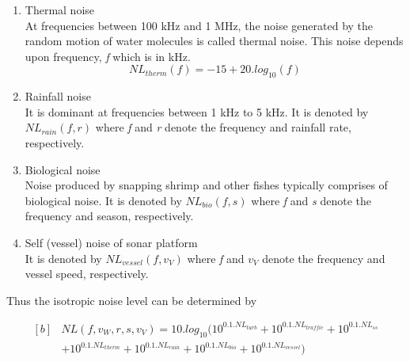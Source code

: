 \begin{enumerate}
  \item Thermal noise \\
\noindent At frequencies between 100 kHz and 1 MHz, the noise generated by the random motion of water molecules is called thermal noise. This noise depends upon frequency, \textit{f} which is in kHz.
\begin{equation}
 NL_{therm}(\textit{f}) = -15 + 20 . log_{10}(\textit{f}) 
\end{equation}

  \item Rainfall noise \\
\noindent It is dominant at frequencies between 1 kHz to 5 kHz. It is denoted by $NL_{rain}(\textit{f}, \textit{r})$ where \textit{f} and \textit{r} denote the frequency and rainfall rate, respectively.

\item Biological noise \\
\noindent Noise produced by snapping shrimp and other fishes typically comprises of biological noise. It is denoted by $NL_{bio}(\textit{f}, \textit{s})$ where \textit{f} and \textit{s} denote the frequency and season, respectively.

\item Self (vessel) noise of sonar platform \\
\noindent It is denoted by $NL_{vessel}(\textit{f}, {v_V})$ where \textit{f} and ${v_V}$ denote the frequency and vessel speed, respectively.
 \end{enumerate}

\noindent  Thus the isotropic noise level can be determined by

\begin{equation}
\begin{aligned}[b]
 & NL (\textit{f}, {v_W},\textit{r},\textit{s}, {v_V}) = 10 . log_{10}(10^{0.1 . NL_{turb}} + 10^{0.1 . NL_{traffic}} + 10^{0.1 . NL_{ss}} \\
 & + 10^{0.1 . NL_{therm}} + 10^{0.1 . NL_{rain}} + 10^{0.1 . NL_{bio}} + 10^{0.1 . NL_{vessel}} )
 \end{aligned}
\end{equation}




